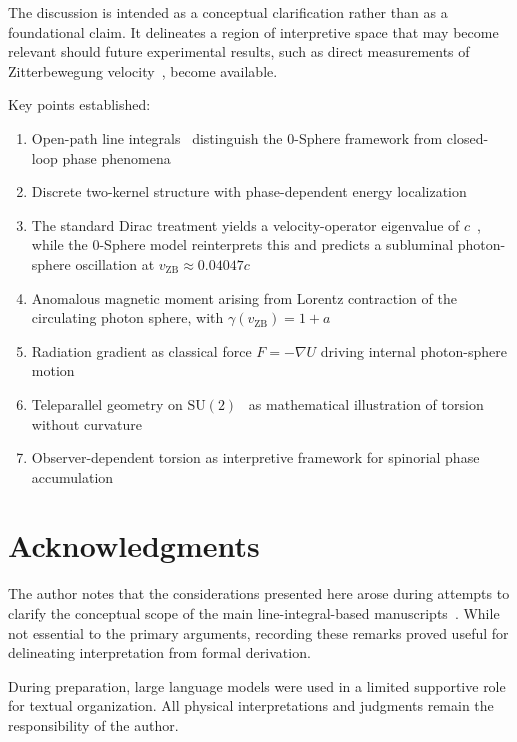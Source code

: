 \documentclass[12pt,letterpaper]{article}
\begin{document}
The discussion is intended as a conceptual clarification rather than as a foundational claim. It delineates a region of interpretive space that may become relevant should future experimental results, such as direct measurements of Zitterbewegung velocity~\cite{hanamura18356895}, become available.

Key points established:
\begin{enumerate}
\item Open-path line integrals~\cite{hanamura18203433} distinguish the 0-Sphere framework from closed-loop phase phenomena~\cite{ABEffect,Berry1984,WilsonLoop}
\item Discrete two-kernel structure with phase-dependent energy localization~\cite{hanamura16759284,hanamura18356895}
\item The standard Dirac treatment yields a velocity-operator eigenvalue of $c$~\cite{Dirac1928}, while the 0-Sphere model reinterprets this and predicts a subluminal photon-sphere oscillation at $v_{\mathrm{ZB}} \approx 0.04047c$~\cite{hanamura17760132,hanamura18356895}
\item Anomalous magnetic moment arising from Lorentz contraction of the circulating photon sphere, with $\gamma(v_{\mathrm{ZB}}) = 1 + a$~\cite{hanamura17765409}
\item Radiation gradient as classical force $F = -\nabla U$ driving internal photon-sphere motion~\cite{hanamura18356895}
\item Teleparallel geometry on $\mathrm{SU}(2)$~\cite{Weitzenbock1923,Aldrovandi2013} as mathematical illustration of torsion without curvature
\item Observer-dependent torsion as interpretive framework for spinorial phase accumulation~\cite{hanamura18067760,hanamura18135855,hanamura18203433}
\end{enumerate}


\section*{Acknowledgments}

The author notes that the considerations presented here arose during attempts to clarify the conceptual scope of the main line-integral-based manuscripts~\cite{hanamura18067760,hanamura18135855,hanamura18203433}. While not essential to the primary arguments, recording these remarks proved useful for delineating interpretation from formal derivation.

During preparation, large language models were used in a limited supportive role for textual organization. All physical interpretations and judgments remain the responsibility of the author.
\end{document}
